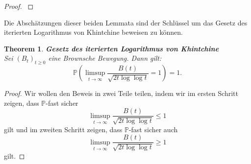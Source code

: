 \documentclass[12pt,a4paper]{scrartcl}
\numberwithin{equation}{section}
\numberwithin{equation}{section}%
\newtheorem{thm}{Theorem}[section]%
\theoremstyle{definition}
\begin{document}
\begin{proof}
\cite[Gleichung 6.11, Seite 68-69]{Schilling}
\end{proof}

\noindent Die Abschätzungen dieser beiden Lemmata sind der Schlüssel um das Gesetz des iterierten Logarithmus von Khintchine beweisen zu können.
\begin{thm}\label{eq:LIL} \textbf{Gesetz des iterierten Logarithmus von Khintchine}\\
Sei $(B_t)_{t\geq 0}$ eine Brownsche Bewegung. Dann gilt:
\begin{equation}
\mathbb{P}\left( \limsup_{t\to\infty} \frac{B(t)}{\sqrt{2t\log\log t}} = 1 \right) = 1.
\end{equation}
\end{thm}

\begin{proof}
Wir wollen den Beweis in zwei Teile teilen, indem wir im ersten Schritt zeigen, dass $\mathbb{P}$-fast sicher 
\begin{equation*}
\limsup_{t\to\infty} \frac{B(t)}{\sqrt{2t\log\log t}} \leq 1
\end{equation*}
gilt und im zweiten Schritt zeigen, dass $\mathbb{P}$-fast sicher auch
\begin{equation*}
\limsup_{t\to\infty} \frac{B(t)}{\sqrt{2t\log\log t}} \geq 1
\end{equation*}
gilt.


\end{proof}
\end{document}
